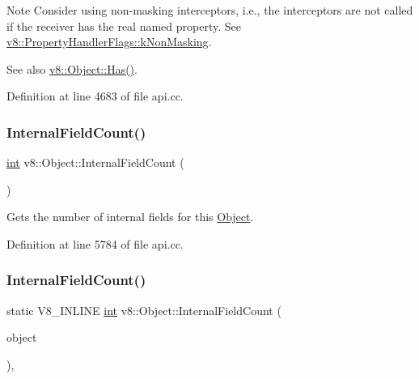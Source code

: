 \begin{DoxyNote}{Note}
Consider using non-\/masking interceptors, i.\+e., the interceptors are not called if the receiver has the real named property. See {\ttfamily \mbox{\hyperlink{namespacev8_af4789f0aeb8680e353901a35810cac1aa8678eef5728c64ca2122dfe336f116aa}{v8\+::\+Property\+Handler\+Flags\+::k\+Non\+Masking}}}.
\end{DoxyNote}
See also \mbox{\hyperlink{classv8_1_1Object_a548a8d4329cf890be3698f1bff9b9837}{v8\+::\+Object\+::\+Has()}}. 

Definition at line 4683 of file api.\+cc.

\mbox{\label{classv8_1_1Object_aaec28576353eebe6fee113bce2718ecc}} 
\subsubsection{\texorpdfstring{Internal\+Field\+Count()}{InternalFieldCount()}\hspace{0.1cm}{\footnotesize\ttfamily [1/2]}}
{\footnotesize\ttfamily \mbox{\hyperlink{classint}{int}} v8\+::\+Object\+::\+Internal\+Field\+Count (\begin{DoxyParamCaption}{ }\end{DoxyParamCaption})}

Gets the number of internal fields for this \mbox{\hyperlink{classv8_1_1Object}{Object}}. 

Definition at line 5784 of file api.\+cc.

\mbox{\label{classv8_1_1Object_a324a71142f621a32bfe5738648718370}} 
\subsubsection{\texorpdfstring{Internal\+Field\+Count()}{InternalFieldCount()}\hspace{0.1cm}{\footnotesize\ttfamily [2/2]}}
{\footnotesize\ttfamily static V8\+\_\+\+I\+N\+L\+I\+NE \mbox{\hyperlink{classint}{int}} v8\+::\+Object\+::\+Internal\+Field\+Count (\begin{DoxyParamCaption}\item[{const \mbox{\hyperlink{classv8_1_1PersistentBase}{Persistent\+Base}}$<$ \mbox{\hyperlink{classv8_1_1Object}{Object}} $>$ \&}]{object }\end{DoxyParamCaption})\hspace{0.3cm}{\ttfamily [inline]}, {\ttfamily [static]}}

